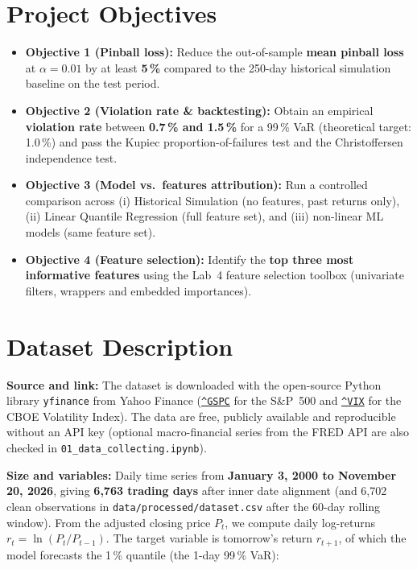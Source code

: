 \documentclass[10pt,a4paper]{article}
\newcommand{\code}[1]{\texttt{\small #1}}
\begin{document}
\section{Project Objectives}
\begin{itemize}
  \item \textbf{Objective 1 (Pinball loss):} Reduce the out-of-sample \textbf{mean pinball loss} at $\alpha = 0.01$ by at least \textbf{5\,\%} compared to the 250-day historical simulation baseline on the test period.
  \item \textbf{Objective 2 (Violation rate \& backtesting):} Obtain an empirical \textbf{violation rate} between \textbf{0.7\,\% and 1.5\,\%} for a 99\,\% VaR (theoretical target: 1.0\,\%) and pass the Kupiec proportion-of-failures test and the Christoffersen independence test.
  \item \textbf{Objective 3 (Model vs.\ features attribution):} Run a controlled comparison across (i) Historical Simulation (no features, past returns only), (ii) Linear Quantile Regression (full feature set), and (iii) non-linear ML models (same feature set).
  \item \textbf{Objective 4 (Feature selection):} Identify the \textbf{top three most informative features} using the Lab~4 feature selection toolbox (univariate filters, wrappers and embedded importances).
\end{itemize}

\section{Dataset Description}
\textbf{Source and link:} The dataset is downloaded with the open-source Python library \code{yfinance} from Yahoo Finance (\href{https://finance.yahoo.com/quote/\%5EGSPC}{\code{\textasciicircum GSPC}} for the S\&P~500 and \href{https://finance.yahoo.com/quote/\%5EVIX}{\code{\textasciicircum VIX}} for the CBOE Volatility Index). The data are free, publicly available and reproducible without an API key (optional macro-financial series from the FRED API are also checked in \code{01\_data\_collecting.ipynb}).

\textbf{Size and variables:} Daily time series from \textbf{January 3, 2000 to November 20, 2026}, giving \textbf{6,763 trading days} after inner date alignment (and 6,702 clean observations in \code{data/processed/dataset.csv} after the 60-day rolling window). From the adjusted closing price $P_t$, we compute daily log-returns $r_t = \ln(P_t / P_{t-1})$. The target variable is tomorrow's return $r_{t+1}$, of which the model forecasts the 1\,\% quantile (the 1-day 99\,\% VaR):
\end{document}
